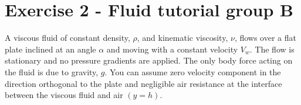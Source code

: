 \documentclass[class=report, crop=false, 12pt,a4paper]{standalone}
\begin{document}
\section{Exercise 2 - Fluid tutorial group B}
A viscous fluid of constant density, $\rho$, and kinematic viscosity, $\nu$, flows over a flat plate inclined at an angle $\alpha$ and moving with a constant velocity $V_w$. The flow is stationary and no pressure gradients are applied. The only body force acting on the fluid is due to gravity, $g$. You can assume zero velocity component in the direction orthogonal to the plate and negligible air resistance at the interface between the viscous fluid and air $(y = h)$.
\end{document}
